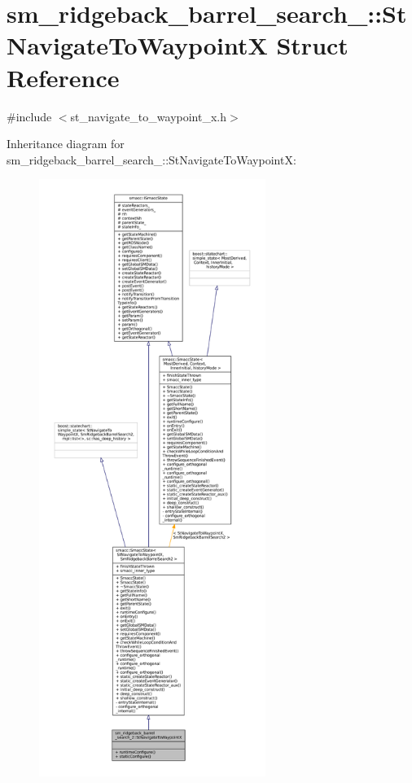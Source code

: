 \hypertarget{structsm__ridgeback__barrel__search__2_1_1StNavigateToWaypointX}{}\section{sm\+\_\+ridgeback\+\_\+barrel\+\_\+search\+\_\+:\+:St\+Navigate\+To\+WaypointX Struct Reference}
\label{structsm__ridgeback__barrel__search__2_1_1StNavigateToWaypointX}


{\ttfamily \#include $<$st\+\_\+navigate\+\_\+to\+\_\+waypoint\+\_\+x.\+h$>$}



Inheritance diagram for sm\+\_\+ridgeback\+\_\+barrel\+\_\+search\+\_\+:\+:St\+Navigate\+To\+WaypointX\+:
\nopagebreak
\begin{figure}[H]
\begin{center}
\leavevmode
\includegraphics[height=550pt]{structsm__ridgeback__barrel__search__2_1_1StNavigateToWaypointX__inherit__graph}
\end{center}
\end{figure}


